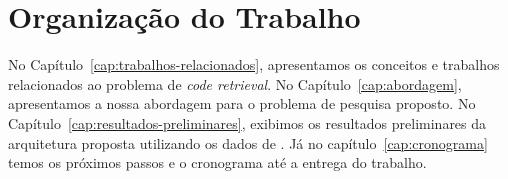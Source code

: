 \section{Organização do Trabalho}
\label{sec:organizacao_trabalho}

No Capítulo~\ref{cap:trabalhos-relacionados}, apresentamos os conceitos e trabalhos relacionados ao problema de \textit{code retrieval}. No Capítulo~\ref{cap:abordagem}, apresentamos a nossa abordagem para o problema de pesquisa proposto. No Capítulo~\ref{cap:resultados-preliminares}, exibimos os resultados preliminares da arquitetura proposta utilizando os dados de \cite{yao-2018}. Já no capítulo~\ref{cap:cronograma} temos os próximos passos e o cronograma até a entrega do trabalho.